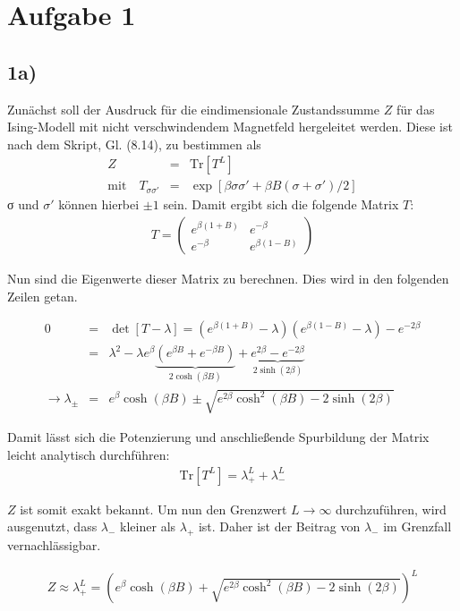 \section*{Aufgabe 1}
\subsection*{1a)}
Zunächst soll der Ausdruck für die eindimensionale Zustandssumme $Z$ für das
Ising-Modell mit nicht verschwindendem Magnetfeld hergeleitet werden. Diese ist
nach dem Skript, Gl. (8.14), zu bestimmen als
\begin{eqnarray}
Z &=& \mathrm{Tr}\left[T^L\right]\\
\mathrm{mit\quad} T_{σσ'} &=& \exp[βσσ' + βB(σ+σ')/2]
\end{eqnarray}
σ und $σ'$ können hierbei $\pm 1$ sein. Damit ergibt sich die folgende Matrix $T$:
\begin{eqnarray}
T = \begin{pmatrix} e^{β(1+B)} & e^{-β} \\ e^{-β} & e^{β(1-B)} \end{pmatrix}
\end{eqnarray}

Nun sind die Eigenwerte dieser Matrix zu berechnen. Dies wird in den folgenden
Zeilen getan.

\begin{eqnarray}
0 &=& \det[T-λ] = (e^{β(1+B)}-λ)(e^{β(1-B)}-λ) - e^{-2β}\\
&=& λ^2 - λe^β\underbrace{\left(e^{βB} + e^{-βB}\right)}_{2\cosh(βB)} + \underbrace{e^{2β} - e^{-2β}}_{2\sinh(2β)}\\
→ λ_{\pm} &=& e^β\cosh(βB) \pm \sqrt{e^{2β}\cosh^2(βB) - 2\sinh(2β)}
\end{eqnarray}

Damit lässt sich die Potenzierung und anschließende Spurbildung der Matrix leicht
analytisch durchführen:
\begin{eqnarray}
\mathrm{Tr}[T^L] = λ_+^L + λ_-^L
\end{eqnarray}

$Z$ ist somit exakt bekannt. Um nun den Grenzwert $L→∞$ durchzuführen, wird ausgenutzt,
dass $λ_-$ kleiner als $λ_+$ ist. Daher ist der Beitrag von $λ_-$ im Grenzfall
vernachlässigbar.

\begin{eqnarray}
Z \approx λ_+^L = \left(e^β\cosh(βB) + \sqrt{e^{2β}\cosh^2(βB) - 2\sinh(2β)}\right)^L
\end{eqnarray}